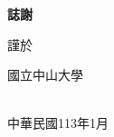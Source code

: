 {}
\begin{center}
  {\bfseries\chinnesesize 誌謝}
\end{center}



\vfill
\begin{flushright}
  \noindent
  [姓名]\hspace{2em}謹於

  \vspace{-6mm}
  國立中山大學
  \vspace{-6mm}

  \noindent \\
  中華民國113年1月

\end{flushright}


\clearpage
